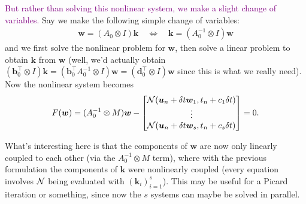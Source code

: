 \documentclass[review]{siamart}
\newcommand{\tcp}{\textcolor{purple}}
\begin{document}
%
%



\tcp{But rather than solving this nonlinear system, we make a slight change of variables.}
Say we make the following simple change of variables:
\begin{align}
\bm{w} = (A_0 \otimes I) \bm{k} 
\quad 
\Longleftrightarrow 
\quad
\bm{k} = (A_0^{-1} \otimes I) \bm{w}
\end{align}
and we first solve the nonlinear problem for $\bm{w}$, then solve a linear problem to obtain $\bm{k}$ from $\bm{w}$ (well, we'd actually obtain $(\bm{b}_0^\top \otimes I) \bm{k} = (\bm{b}_0^\top A_0^{-1} \otimes I) \bm{w} = (\bm{d}_0^\top \otimes I) \bm{w}$ since this is what we really need). Now the nonlinear system becomes
\begin{align}
F(\bm{w}) = ( A_0^{-1} \otimes M ) \bm{w} - 
\begin{bmatrix}
{\cal N}(\bm{u}_{n} + \delta t \bm{w}_1, t_n + c_1 \delta t)\\
\vdots\\
{\cal N}(\bm{u}_{n} + \delta t \bm{w}_s, t_n + c_s \delta t)\\
\end{bmatrix}
= 
0.
\end{align}

\begin{remark}
What's interesting here is that the components of $\bm{w}$ are now only linearly coupled to each other (via the $A_0^{-1} \otimes M$ term), where with the previous formulation the components of $\bm{k}$ were nonlinearly coupled (every equation involves ${\cal N}$ being evaluated with $(\bm{k}_i)_{i =1}^s$). 
This may be useful for a Picard iteration or something, since now the $s$ systems can maybe be solved in parallel. 
\end{remark}
\end{document}
